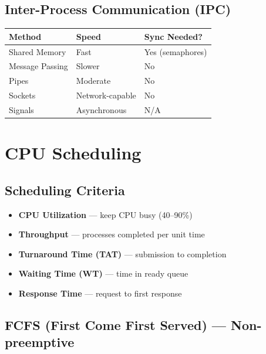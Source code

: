 \documentclass[12pt,a4paper]{article}
\begin{document}
\subsection{Inter-Process Communication (IPC)}
\begin{center}
\begin{tabular}{@{} l l l @{}}
\toprule
\textbf{Method} & \textbf{Speed} & \textbf{Sync Needed?} \\
\midrule
Shared Memory & Fast & Yes (semaphores) \\
Message Passing & Slower & No \\
Pipes & Moderate & No \\
Sockets & Network-capable & No \\
Signals & Asynchronous & N/A \\
\bottomrule
\end{tabular}
\end{center}

\section{CPU Scheduling}

\subsection{Scheduling Criteria}
\begin{itemize}[leftmargin=*]
    \item \textbf{CPU Utilization} --- keep CPU busy (40--90\%)
    \item \textbf{Throughput} --- processes completed per unit time
    \item \textbf{Turnaround Time (TAT)} --- submission to completion
    \item \textbf{Waiting Time (WT)} --- time in ready queue
    \item \textbf{Response Time} --- request to first response
\end{itemize}

\subsection{FCFS (First Come First Served) --- Non-preemptive}
\end{document}
